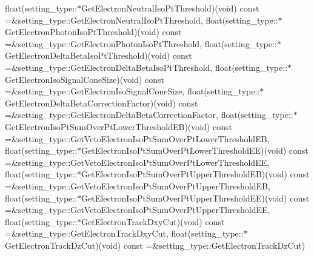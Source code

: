 \begin{DoxyCompactItemize}
float(setting\_\-type::$\ast$GetElectronNeutralIsoPtThreshold)(void) const =\&setting\_\-type::GetElectronNeutralIsoPtThreshold, float(setting\_\-type::$\ast$GetElectronPhotonIsoPtThreshold)(void) const =\&setting\_\-type::GetElectronPhotonIsoPtThreshold, float(setting\_\-type::$\ast$GetElectronDeltaBetaIsoPtThreshold)(void) const =\&setting\_\-type::GetElectronDeltaBetaIsoPtThreshold, float(setting\_\-type::$\ast$GetElectronIsoSignalConeSize)(void) const =\&setting\_\-type::GetElectronIsoSignalConeSize, float(setting\_\-type::$\ast$GetElectronDeltaBetaCorrectionFactor)(void) const =\&setting\_\-type::GetElectronDeltaBetaCorrectionFactor, float(setting\_\-type::$\ast$GetElectronIsoPtSumOverPtLowerThresholdEB)(void) const =\&setting\_\-type::GetVetoElectronIsoPtSumOverPtLowerThresholdEB, float(setting\_\-type::$\ast$GetElectronIsoPtSumOverPtLowerThresholdEE)(void) const =\&setting\_\-type::GetVetoElectronIsoPtSumOverPtLowerThresholdEE, float(setting\_\-type::$\ast$GetElectronIsoPtSumOverPtUpperThresholdEB)(void) const =\&setting\_\-type::GetVetoElectronIsoPtSumOverPtUpperThresholdEB, float(setting\_\-type::$\ast$GetElectronIsoPtSumOverPtUpperThresholdEE)(void) const =\&setting\_\-type::GetVetoElectronIsoPtSumOverPtUpperThresholdEE, float(setting\_\-type::$\ast$GetElectronTrackDxyCut)(void) const =\&setting\_\-type::GetElectronTrackDxyCut, float(setting\_\-type::$\ast$GetElectronTrackDzCut)(void) const =\&setting\_\-type::GetElectronTrackDzCut)
\end{DoxyCompactItemize}


